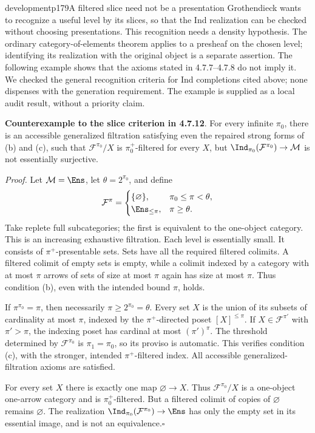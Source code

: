 \begin{dcomment}{development}{p179}{A filtered slice need not be a presentation}
Grothendieck wants to recognize a useful level by its slices, so that the Ind realization can be checked without choosing presentations. This recognition needs a density hypothesis. The ordinary category-of-elements theorem applies to a presheaf on the chosen level; identifying its realization with the original object is a separate assertion. The following example shows that the axioms stated in 4.7.7--4.7.8 do not imply it. We checked the general recognition criteria for Ind completions cited above; none dispenses with the generation requirement. The example is supplied as a local audit result, without a priority claim.

\textbf{Counterexample to the slice criterion in 4.7.12}\ours.
For every infinite $\pi_0$, there is an accessible generalized filtration satisfying even the repaired strong forms of (b) and (c), such that $\mathcal F^{\pi_0}/X$ is $\pi_0^+$-filtered for every $X$, but $\Ind_{\pi_0}(\mathcal F^{\pi_0})\to\mathcal M$ is not essentially surjective.

\textit{Proof.} Let $\mathcal M=\Ens$, let $\theta=2^{\pi_0}$, and define
\[
 \mathcal F^\pi=
 \begin{cases}
 \{\varnothing\},&\pi_0\leq\pi<\theta,\\
 \Ens_{\leq\pi},&\pi\geq\theta.
 \end{cases}
\]
Take replete full subcategories; the first is equivalent to the one-object category. This is an increasing exhaustive filtration. Each level is essentially small. It consists of $\pi^+$-presentable sets. Sets have all the required filtered colimits. A filtered colimit of empty sets is empty, while a colimit indexed by a category with at most $\pi$ arrows of sets of size at most $\pi$ again has size at most $\pi$. Thus condition (b), even with the intended bound $\pi$, holds.

If $\pi^{\pi_0}=\pi$, then necessarily $\pi\geq2^{\pi_0}=\theta$. Every set $X$ is the union of its subsets of cardinality at most $\pi$, indexed by the $\pi^+$-directed poset $[X]^{\leq\pi}$. If $X\in\mathcal F^{\pi'}$ with $\pi'>\pi$, the indexing poset has cardinal at most $(\pi')^\pi$. The threshold determined by $\mathcal F^{\pi_0}$ is $\pi_1=\pi_0$, so its proviso is automatic. This verifies condition (c), with the stronger, intended $\pi^+$-filtered index. All accessible generalized-filtration axioms are satisfied.

For every set $X$ there is exactly one map $\varnothing\to X$. Thus $\mathcal F^{\pi_0}/X$ is a one-object one-arrow category and is $\pi_0^+$-filtered. But a filtered colimit of copies of $\varnothing$ remains $\varnothing$. The realization $\Ind_{\pi_0}(\mathcal F^{\pi_0})\to\Ens$ has only the empty set in its essential image, and is not an equivalence.\hfill$\square$


\end{dcomment}
